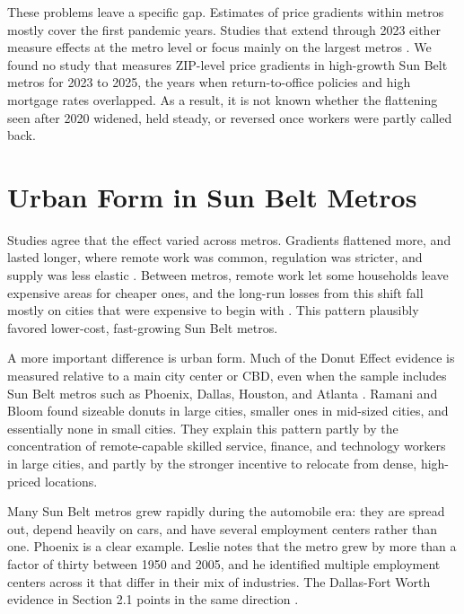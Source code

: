 \documentclass[11pt]{article}
\begin{document}
These problems leave a specific gap. Estimates of price gradients within metros \cite{brueckner2023spatial,gupta2022flattening} mostly cover the first pandemic years. Studies that extend through 2023 either measure effects at the metro level \cite{mondragon2022housing} or focus mainly on the largest metros \cite{ramani2024reshapes}. We found no study that measures ZIP-level price gradients in high-growth Sun Belt metros for 2023 to 2025, the years when return-to-office policies and high mortgage rates overlapped. As a result, it is not known whether the flattening seen after 2020 widened, held steady, or reversed once workers were partly called back.

\section{Urban Form in Sun Belt Metros}

Studies agree that the effect varied across metros. Gradients flattened more, and lasted longer, where remote work was common, regulation was stricter, and supply was less elastic \cite{gupta2022flattening,ramani2024reshapes}. Between metros, remote work let some households leave expensive areas for cheaper ones, and the long-run losses from this shift fall mostly on cities that were expensive to begin with \cite{brueckner2023spatial,howard2023short}. This pattern plausibly favored lower-cost, fast-growing Sun Belt metros.

A more important difference is urban form. Much of the Donut Effect evidence is measured relative to a main city center or CBD, even when the sample includes Sun Belt metros such as Phoenix, Dallas, Houston, and Atlanta \cite{ramani2021donut}. Ramani and Bloom \cite{ramani2021donut} found sizeable donuts in large cities, smaller ones in mid-sized cities, and essentially none in small cities. They explain this pattern partly by the concentration of remote-capable skilled service, finance, and technology workers in large cities, and partly by the stronger incentive to relocate from dense, high-priced locations.

Many Sun Belt metros grew rapidly during the automobile era: they are spread out, depend heavily on cars, and have several employment centers rather than one. Phoenix is a clear example. Leslie \cite{leslie2010identification} notes that the metro grew by more than a factor of thirty between 1950 and 2005, and he identified multiple employment centers across it that differ in their mix of industries. The Dallas-Fort Worth evidence in Section 2.1 points in the same direction \cite{waddell1993residential}.
\end{document}
